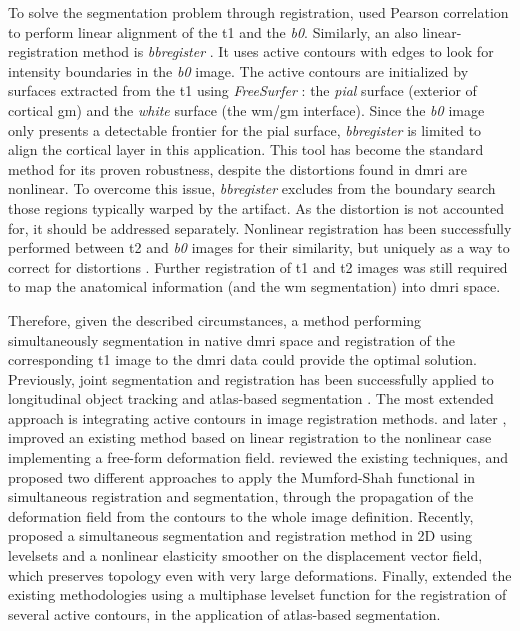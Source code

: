 To solve the segmentation problem through registration, \cite{saad_new_2009} 
  used Pearson correlation to perform linear alignment of the \gls*{t1} and 
  the \emph{b0}.
Similarly, an also linear-registration method is \emph{bbregister} \citep{greve_accurate_2009}.
It uses active contours with edges to look for intensity boundaries in the \emph{b0}
  image.
The active contours are initialized by surfaces extracted from the 
  \gls*{t1} using \emph{FreeSurfer} \citep{fischl_freesurfer_2012}:
  the \emph{pial} surface (exterior of cortical \gls*{gm}) and the \emph{white}
  surface (the \gls*{wm}/\gls*{gm} interface). 
Since the \emph{b0} image only presents a detectable frontier for the pial surface,
  \emph{bbregister} is limited to align the cortical layer in this
  application.
This tool has become the standard method for its proven robustness, despite the 
  distortions found in \gls*{dmri} are nonlinear.
To overcome this issue, \emph{bbregister} excludes from the boundary search those
  regions typically warped by the artifact.
As the distortion is not accounted for, it should be addressed separately.
Nonlinear registration has been successfully performed between \gls*{t2} and \emph{b0}
  images for their similarity, but uniquely as a way to correct for distortions
  \citep{kybic_unwarping_2000,studholme_accurate_2000,wu_comparison_2008,tao_variational_2009}.
Further registration of \gls*{t1} and \gls*{t2} images was still required to map the anatomical
  information (and the \gls*{wm} segmentation) into \gls*{dmri} space.

Therefore, given the described circumstances, a method performing simultaneously
  segmentation in native \gls*{dmri} space and registration of the corresponding \gls*{t1} image
  to the \gls*{dmri} data could provide the optimal solution.
Previously, joint segmentation and registration has been successfully applied to
  longitudinal object tracking \citep{paragios_level_2003} and atlas-based
  segmentation \citep{gorthi_active_2011}.
The most extended approach is integrating active contours in image registration 
  methods.
\cite{unal_coupled_2005} and later \cite{wang_joint_2006},
  improved an existing method \citep{yezzi_variational_2003} based on linear registration
  to the nonlinear case implementing a free-form deformation field.
\cite{droske_mumfordshah_2009} reviewed the existing techniques, and proposed two different
  approaches to apply the Mumford-Shah functional \citep{mumford_optimal_1989} in simultaneous
  registration and segmentation, through the propagation of the deformation field from
  the contours to the whole image definition.
Recently, \cite{guyader_combined_2011} proposed a simultaneous segmentation and
  registration method in 2D using levelsets and a nonlinear elasticity smoother on the
  displacement vector field, which preserves topology even with very large deformations.
Finally, \cite{gorthi_active_2011} extended the existing methodologies using a multiphase
  levelset function for the registration of several active contours, in the application
  of atlas-based segmentation.
  
